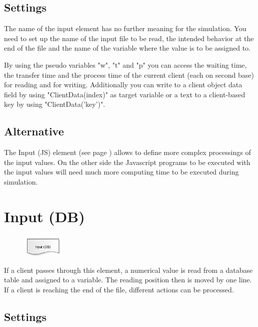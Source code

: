 \subsection*{Settings}

The name of the input element has no further meaning for the simulation.
You need to set up the name of the input file to be read, the intended behavior
at the end of the file and the name of the variable where the value is to
be assigned to.

By using the pseudo variables "w", "t" and "p" you can access the waiting time, the transfer time and the
process time of the current client (each on second base) for reading and for writing. Additionally you can
write to a client object data field by using "ClientData(index)" as target variable or a text to a client-based
key by using "ClientData('key')".

\subsection*{Alternative}

The Input (JS) element (see page \pageref{ref:ModelElementInputJS}) allows to define more complex processings
of the input values. On the other side the Javascript programs to be executed with the input values
will need much more computing time to be executed during simulation.


\section{Input (DB)}
\label{ref:ModelElementInputDB}

\begin{figure}
\vspace{-22pt}
\includegraphics[width=2cm]{imageModelElementInputDB.png}
\vspace{-22pt}
\end{figure}

If a client passes through this element, a numerical value is read from a
database table and assigned to a variable. The reading position then is moved by one line.
If a client is reaching the end of the file, different actions can be processed.

\subsection*{Settings}

